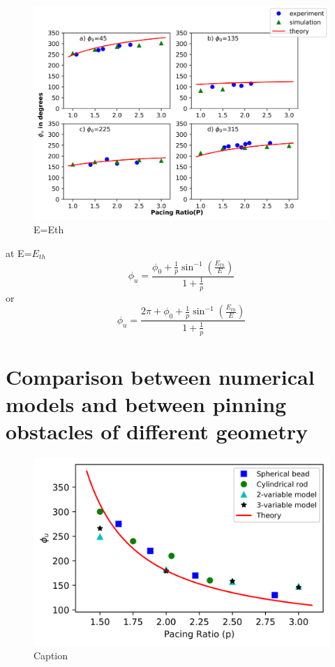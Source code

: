\documentclass[%
 reprint,
 amsmath,amssymb,
 aps,
prb,
]{revtex4-2}
\begin{document}
\begin{figure}[H]
    \centering
    \includegraphics{appendix_cw_Eth.png}
    \caption{E=Eth}
    \label{fig:unpinning_cw}
\end{figure}
at E=$E_{th}$
\begin{equation}
    \phi_{u} = \frac{\phi_{0}+\frac{1}{p}{\sin^{-1}} (\frac{E_{th}}{E})}{1+\frac{1}{p}}
    \label{eq:basic_eqn_cw}
\end{equation}
\centering or 
\begin{equation}
    \phi_{u} = \frac{2\pi+\phi_{0}+\frac{1}{p}{\sin^{-1}} (\frac{E_{th}}{E})}{1+\frac{1}{p}}
    \label{eq:basic_eqn_cw}
\end{equation}
\fi


\section{Comparison between numerical models and between pinning obstacles of different geometry}

\begin{figure}[H]
    \centering
    \includegraphics{appendix_23oregonator_beadrod.png}
    \caption{Caption}
    \label{fig:unpinning_comparison}
\end{figure}


\nocite{*}

\end{document}
